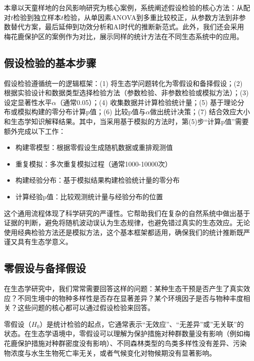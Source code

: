 \documentclass[
  twoside,12pt,fontset=none]{ctexbook}
\providecommand{\tightlist}{%
  \setlength{\itemsep}{0pt}\setlength{\parskip}{0pt}}
\begin{document}
本章以天童样地的台风影响研究为核心案例，系统阐述假设检验的核心方法：从配对\(t\)检验到独立样本\(t\)检验，从单因素ANOVA到多重比较校正，从参数方法到非参数替代方案，最后延伸到功效分析和AI时代的推断新范式。此外，我们还会采用梅花鹿保护区的案例作为对比，展示同样的统计方法在不同生态系统中的应用。

\hypertarget{ux5047ux8bbeux68c0ux9a8cux7684ux57faux672cux6b65ux9aa4}{%
\subsection{假设检验的基本步骤}\label{ux5047ux8bbeux68c0ux9a8cux7684ux57faux672cux6b65ux9aa4}}

假设检验遵循统一的逻辑框架：(1) 将生态学问题转化为零假设和备择假设；(2) 根据实验设计和数据类型选择检验方法（参数检验、非参数检验或模拟方法）；(3) 设定显著性水平\(\alpha\)（通常0.05）；(4) 收集数据并计算检验统计量；(5) 基于理论分布或模拟构建的零分布计算p值；(6) 比较p值与\(\alpha\)做出统计决策；(7) 结合效应大小和生态学知识解释结果。其中，当采用基于模拟的方法时，第(5)步``计算p值''需要额外完成以下工作：

\begin{itemize}
\tightlist
\item
  构建零模型：根据零假设生成随机数据或重排观测值
\item
  重复模拟：多次重复模拟过程（通常1000-10000次）
\item
  构建经验分布：基于模拟结果构建检验统计量的零分布
\item
  计算经验p值：比较观测统计量与经验分布的位置
\end{itemize}

这个通用流程体现了科学研究的严谨性。它帮助我们在复杂的自然系统中做出基于证据的判断，避免将随机波动误认为生态规律，也避免错过真实的生态效应。无论使用经典检验方法还是模拟方法，这个基本框架都适用，确保我们的统计推断既严谨又具有生态学意义。

\hypertarget{ux96f6ux5047ux8bbeux4e0eux5907ux62e9ux5047ux8bbe}{%
\subsection{零假设与备择假设}\label{ux96f6ux5047ux8bbeux4e0eux5907ux62e9ux5047ux8bbe}}

在生态学研究中，我们常常需要回答这样的问题：某种生态干预是否产生了真实效应？不同生境中的物种多样性是否存在显著差异？某个环境因子是否与物种丰度相关？这些问题的核心都可以通过假设检验来回答。

零假设（\(H_0\)）是统计检验的起点，它通常表示``无效应''、``无差异''或''无关联''的状态。在生态学语境中，零假设可以理解为保护措施对种群数量没有影响（例如梅花鹿保护措施对种群密度没有影响）、不同森林类型的鸟类多样性没有差异、污染物浓度与水生生物死亡率无关，或者气候变化对物候期没有显著影响。
\end{document}
